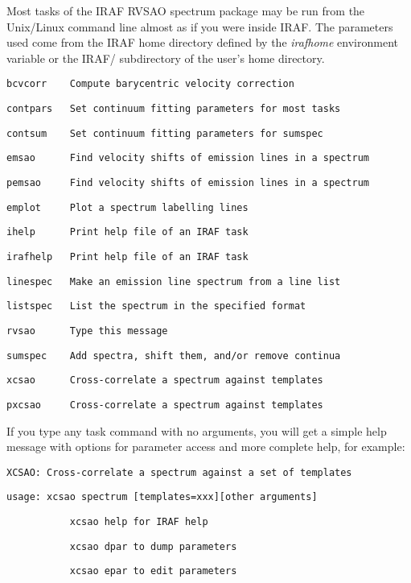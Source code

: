 Most tasks of the IRAF RVSAO spectrum package may be run from the Unix/Linux command line almost as if you were inside IRAF. The parameters used come from the IRAF home directory defined by the \textit{irafhome} environment variable or the IRAF/ subdirectory of the user's home directory.

\texttt{bcvcorr~~~~Compute barycentric velocity correction}

\texttt{contpars~~~Set continuum fitting parameters for most tasks}

\texttt{contsum~~~~Set continuum fitting parameters for sumspec}

\texttt{emsao~~~~~~Find velocity shifts of emission lines in a spectrum}

\texttt{pemsao~~~~~Find velocity shifts of emission lines in a spectrum}

\texttt{emplot~~~~~Plot a spectrum labelling lines}

\texttt{ihelp~~~~~~Print help file of an IRAF task}

\texttt{irafhelp~~~Print help file of an IRAF task}

\texttt{linespec~~~Make an emission line spectrum from a line list}

\texttt{listspec~~~List the spectrum in the specified format}

\texttt{rvsao~~~~~~Type this message}

\texttt{sumspec~~~~Add spectra, shift them, and/or remove continua}

\texttt{xcsao~~~~~~Cross-correlate a spectrum against templates}

\texttt{pxcsao~~~~~Cross-correlate a spectrum against templates}

If you type any task command with no arguments, you will get a simple help message with options for parameter access and more complete help, for example:

\texttt{XCSAO: Cross-correlate a spectrum against a set of templates}

\texttt{usage: xcsao spectrum [templates=xxx][other arguments]}

\texttt{~~~~~~~~~~~xcsao help for IRAF help}

\texttt{~~~~~~~~~~~xcsao dpar to dump parameters}

\texttt{~~~~~~~~~~~xcsao epar to edit parameters}

